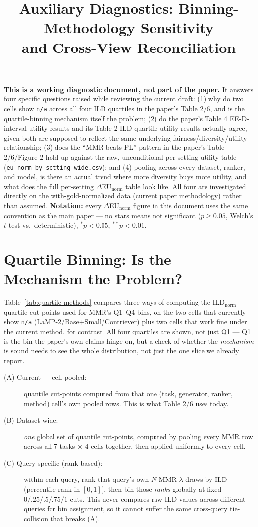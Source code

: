 \documentclass[10pt]{article}
\title{Auxiliary Diagnostics: Binning-Methodology Sensitivity\\and Cross-View Reconciliation}
\author{}
\date{}
\begin{document}
\maketitle

\noindent\textbf{This is a working diagnostic document, not part of the paper.} It
answers four specific questions raised while reviewing the current draft: (1) why
do two cells show \texttt{n/a} across all four ILD quartiles in the paper's Table
2/6, and is the quartile-binning mechanism itself the problem; (2) do the paper's
Table 4 EE-D-interval utility results and its Table 2 ILD-quartile utility results
actually agree, given both are supposed to reflect the same underlying
fairness/diversity/utility relationship; (3) does the ``MMR beats PL'' pattern in
the paper's Table 2/6/Figure 2 hold
up against the raw, unconditional per-setting utility table
(\texttt{eu\_norm\_by\_setting\_wide.csv}); and (4) pooling across every dataset,
ranker, and model, is there an actual trend where more diversity buys more utility,
and what does the full per-setting $\Delta$EU$_{\text{norm}}$ table look like. All
four are investigated directly on the with-gold-normalized data (current paper
methodology) rather than assumed. \textbf{Notation:} every $\Delta$EU$_{\text{norm}}$
figure in this document uses the same convention as the main paper --- no stars
means not significant ($p\geq0.05$, Welch's $t$-test vs.\ deterministic),
$^*p{<}0.05$, $^{**}p{<}0.01$.

\section{Quartile Binning: Is the Mechanism the Problem?}
\label{sec:quartile}

Table~\ref{tab:quartile-methods} compares three ways of computing the ILD$_{\text{norm}}$
quartile cut-points used for MMR's Q1--Q4 bins, on the two cells that currently show
\texttt{n/a} (LaMP-2/Base+Small/Contriever) plus two cells that work fine under the
current method, for contrast. All four quartiles are shown, not just Q1 --- Q1 is
the bin the paper's own claims hinge on, but a check of whether the \emph{mechanism}
is sound needs to see the whole distribution, not just the one slice we already
report.

\begin{description}
  \item[(A) Current --- cell-pooled:] quantile cut-points computed from that one
    (task, generator, ranker, method) cell's own pooled rows. This is what Table 2/6
    uses today.
  \item[(B) Dataset-wide:] \emph{one} global set of quantile cut-points, computed by
    pooling every MMR row across all 7 tasks $\times$ 4 cells together, then applied
    uniformly to every cell.
  \item[(C) Query-specific (rank-based):] within each query, rank that query's own
    $N$ MMR-$\lambda$ draws by ILD (percentile rank in $[0,1]$), then bin those
    \emph{ranks} globally at fixed $0/.25/.5/.75/1$ cuts. This never compares raw
    ILD values across different queries for bin assignment, so it cannot suffer the
    same cross-query tie-collision that breaks (A).
\end{description}
\end{document}
